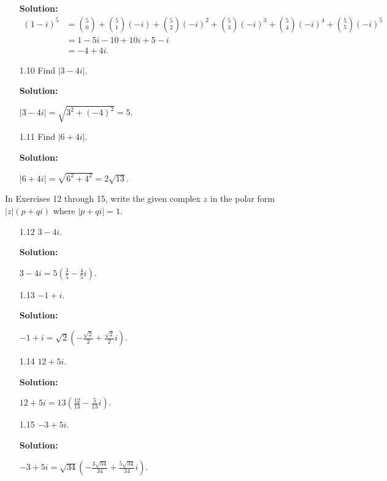 \begin{enumerate}
      \textbf{Solution:}
      \begin{align*}
         \displaystyle(1 - i)^5 &= \binom{5}{0} + \binom{5}{1} (-i) +
         \binom{5}{2} (-i)^2 + \binom{5}{3} (-i)^3 + \binom{5}{4} (-i)^4 + 
         \binom{5}{5} (-i)^5 \\
         &= 1 - 5i - 10 + 10i + 5 - i \\
         &= -4 + 4i.
      \end{align*}

   \item[1.10] Find $|3 - 4i|$.
		
		\textbf{Solution:}
		
		$|3 - 4i| = \sqrt{3^2 + (-4)^2} = 5$.
   \item[1.11] Find $|6 + 4i|$.
		
		\textbf{Solution:}
		
		$|6 + 4i| = \sqrt{6^2 + 4^2} = 2\sqrt{13}$.
\end{enumerate}

\noindent In Exercises 12 through 15, write the given complex $z$ in the polar
form $|z|(p + qi)$ where $|p + qi| = 1$. 
\begin{enumerate}
   \item[1.12] $3 - 4i$.
		
		\textbf{Solution:}
		
		$\displaystyle 3 - 4i = 5\left(\frac{3}{5} - \frac{4}{5}i\right)$.
   \item[1.13] $-1 + i$.
		
		\textbf{Solution:}
		
		$\displaystyle -1 + i = \sqrt{2}\left(-\frac{\sqrt{2}}{2} + 
		 \frac{\sqrt{2}}{2}i\right)$.
   \item[1.14] $12 + 5i$.
		
		\textbf{Solution:}
		
		$\displaystyle 12 + 5i = 13\left(\frac{12}{13} - \frac{5}{13}i\right)$.
   \item[1.15] $-3 + 5i$.
		
		\textbf{Solution:}
		
		$\displaystyle -3 + 5i = \sqrt{34}\left(-\frac{3\sqrt{34}}{34} + 
		 \frac{5\sqrt{34}}{34}i\right)$.
\end{enumerate}

